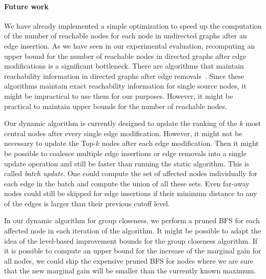 \paragraph{Future work}
We have already implemented a simple optimization to speed up the computation of the number of reachable nodes for each node in undirected graphs after an edge insertion. As we have seen in our experimental evaluation, recomputing an upper bound for the number of reachable nodes in directed graphs after edge modifications is a significant bottleneck. There are algorithms that maintain reachability information in directed graphs after edge removals~\cite{lkacki2013improved,chechik2016decremental}. Since these algorithms maintain exact reachability information for single source nodes, it might be impractical to use them for our purposes. However, it might be practical to maintain upper bounds for the number of reachable nodes.

Our dynamic algorithm is currently designed to update the ranking of the $k$ most central nodes after every single edge modification. However, it might not be necessary to update the Top-$k$ nodes after each edge modification. Then it might be possible to coalesce multiple edge insertions or edge removals into a single update operation and still be faster than running the static algorithm. This is called \emph{batch update}. One could compute the set of affected nodes individually for each edge in the batch and compute the union of all these sets. Even far-away nodes could still be skipped for edge insertions if their minimum distance to any of the edges is larger than their previous cutoff level.

In our dynamic algorithm for group closeness, we perform a pruned BFS for each affected node in each iteration of the algorithm. It might be possible to adapt the idea of the level-based improvement bounds for the group closeness algorithm. If it is possible to compute an upper bound for the increase of the marginal gain for all nodes, we could skip the expensive pruned BFS for nodes where we are sure that the new marginal gain will be smaller than the currently known maximum.


